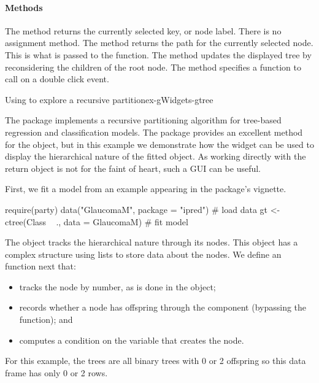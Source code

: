 \paragraph{Methods}
The  method returns the currently selected key,
or node label. There is no assignment method. The \method{[}{gtree}
method returns the path for the currently selected node. This is what
is passed to the  function.  The
 method updates the displayed tree by
reconsidering the children of the root node.  The method
 specifies a function to call on
a double click event.

\begin{example}{Using  to explore a recursive partition}{ex-gWidgets-gtree}

The  package implements a recursive partitioning algorithm
for tree-based regression and classification models. The package
provides an excellent  method for the object, but in this
example we demonstrate how the  widget can be used to
display the hierarchical nature of the fitted object. As working
directly with the return object is not for the faint of heart, such a
GUI can be useful.

First, we fit a model from an
example appearing in the package's vignette.

\begin{Schunk}
\begin{Sinput}
 require(party)
 data("GlaucomaM", package = "ipred")      # load data
 gt <- ctree(Class ~ ., data = GlaucomaM)  # fit model
\end{Sinput}
\end{Schunk}

The  object tracks the hierarchical nature through its
nodes. This object has a complex structure using lists to store data
about the nodes. We define an  function next that:
\begin{itemize}
\item tracks the node by number, as is done in the  object;
\item records whether a node has offspring through the 
  component (bypassing the  function); and
\item computes a
  condition on the variable that creates the node.
\end{itemize}
For this example, the
trees are all binary trees with 0 or 2 offspring so this data frame
has only 0 or 2 rows.


\end{example}
